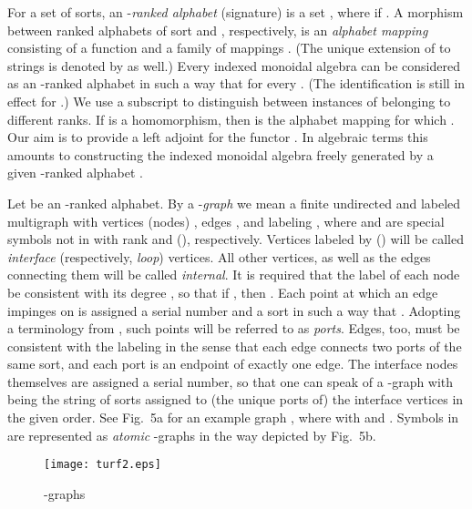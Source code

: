 \documentclass{eptcs}
\begin{document}
For a set  of sorts, an -{\em ranked alphabet} (signature) is a set 
, where 
if . A morphism  between ranked alphabets of sort
 and , respectively, is an {\em alphabet mapping\/} consisting of a function
 and a family of mappings .
(The unique extension of  to strings is denoted by  as well.)
Every indexed monoidal algebra  can be considered
as an -ranked alphabet  in such a way that  for every . (The identification
 is still in effect for .) We use a subscript to distinguish
between instances of  belonging to different ranks. If  is a homomorphism, then  is 
the alphabet mapping  for which .
Our aim is to provide a left adjoint for the functor . In algebraic terms this 
amounts to constructing the indexed monoidal algebra freely generated by a given 
-ranked alphabet .

Let  be an -ranked alphabet. By a -{\em graph\/} we mean a
finite undirected and labeled multigraph  with vertices (nodes) , edges , and
labeling , where  and
 are special symbols not in  with rank  and (), respectively.
Vertices labeled by  () will be called {\em interface\/} (respectively,
{\em loop\/}) vertices. All other vertices, as well as the edges connecting them will be 
called {\em internal\/}. It is required that the label of each node  be consistent 
with its degree , so that if , then . Each point at which 
an edge impinges on  is assigned a serial number  and a sort
 in such a way that . Adopting a terminology from \cite
{tcs,mil}, such points will be referred to as {\em ports}. Edges, too,
must be consistent with the labeling in the sense that each edge connects two
ports of the same sort, and each port is  an endpoint of exactly one edge. The
interface nodes themselves are assigned a serial number, so that one can speak
of a -graph  with  being the string of sorts assigned to (the
unique ports of) the interface vertices in the given order. See Fig.~5a for an
example   graph , where  with  and . Symbols in
 are represented as {\em atomic\/} -graphs in the way
depicted by Fig.~5b. 
\begin{figure}[h]
\begin{center} 
\texttt{[image: turf2.eps]}
\end{center}
\vspmini
\caption{-graphs}
\vspmini
\end{figure}
\end{document}
